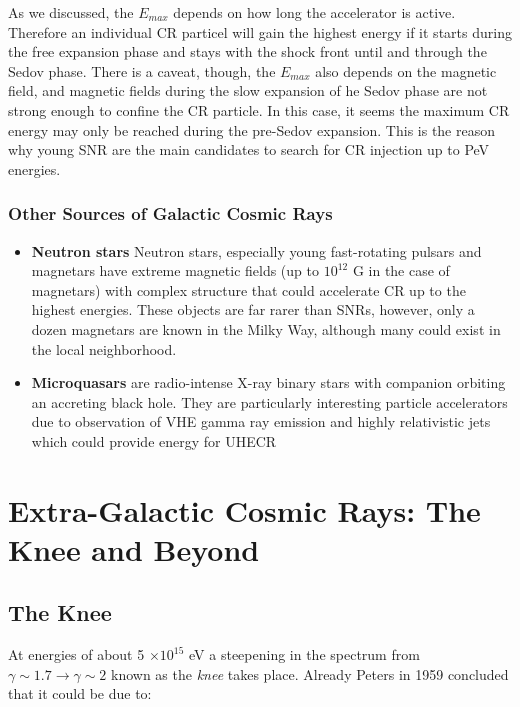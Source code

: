 \documentclass[
  letterpaper,
  DIV=11,
  numbers=noendperiod]{scrreprt}
\begin{document}
As we discussed, the \(E_{max}\) depends on how long the accelerator is
active. Therefore an individual CR particel will gain the highest energy
if it starts during the free expansion phase and stays with the shock
front until and through the Sedov phase. There is a caveat, though, the
\(E_{max}\) also depends on the magnetic field, and magnetic fields
during the slow expansion of he Sedov phase are not strong enough to
confine the CR particle. In this case, it seems the maximum CR energy
may only be reached during the pre-Sedov expansion. This is the reason
why young SNR are the main candidates to search for CR injection up to
PeV energies.

\subsubsection{Other Sources of Galactic Cosmic
Rays}\label{other-sources-of-galactic-cosmic-rays}

\begin{itemize}
\item
  \textbf{Neutron stars} Neutron stars, especially young fast-rotating
  pulsars and magnetars have extreme magnetic fields (up to \(10^{12}\)
  G in the case of magnetars) with complex structure that could
  accelerate CR up to the highest energies. These objects are far rarer
  than SNRs, however, only a dozen magnetars are known in the Milky Way,
  although many could exist in the local neighborhood.
\item
  \textbf{Microquasars} are radio-intense X-ray binary stars with
  companion orbiting an accreting black hole. They are particularly
  interesting particle accelerators due to observation of VHE gamma ray
  emission and highly relativistic jets which could provide energy for
  UHECR
\end{itemize}

\section{Extra-Galactic Cosmic Rays: The Knee and
Beyond}\label{extra-galactic-cosmic-rays-the-knee-and-beyond}

\subsection{The Knee}\label{sec-knee}

At energies of about 5 \(\times 10^{15}\) eV a steepening in the
spectrum from \(\gamma \sim 1.7 \rightarrow \gamma \sim 2\) known as the
\emph{knee} takes place. Already Peters in 1959 concluded that it could
be due to:
\end{document}
